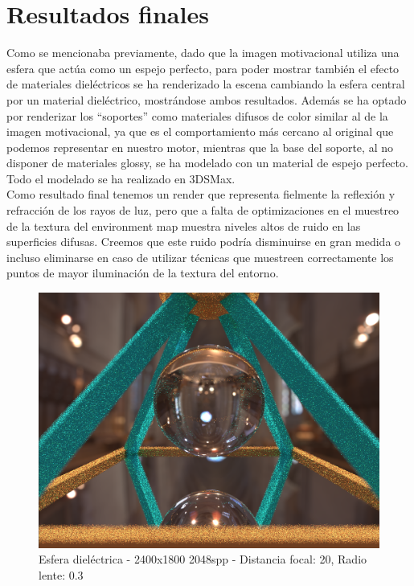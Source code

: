 \documentclass[10pt,oneside,a4paper]{article}
\begin{document}
\section{Resultados finales}
Como se mencionaba previamente, dado que la imagen motivacional utiliza una esfera que actúa como un espejo perfecto, para poder mostrar también el efecto de materiales dieléctricos se ha renderizado la escena cambiando la esfera central por un material dieléctrico, mostrándose ambos resultados. Además se ha optado por renderizar los ``soportes'' como materiales difusos de color similar al de la imagen motivacional, ya que es el comportamiento más cercano al original que podemos representar en nuestro motor, mientras que la base del soporte, al no disponer de materiales glossy, se ha modelado con un material de espejo perfecto. Todo el modelado se ha realizado en 3DSMax.\\

Como resultado final tenemos un render que representa fielmente la reflexión y refracción de los rayos de luz, pero que a falta de optimizaciones en el muestreo de la textura del environment map muestra niveles altos de ruido en las superficies difusas. Creemos que este ruido podría disminuirse en gran medida o incluso eliminarse en caso de utilizar técnicas que muestreen correctamente los puntos de mayor iluminación de la textura del entorno.

\begin{figure}[h]
\centering
\includegraphics[width=1\linewidth]{images/escena_2400x1800_2048spp_dof20-03_screencap.png}
\caption{Esfera dieléctrica - 2400x1800 2048spp - Distancia focal: 20, Radio lente: 0.3}
\label{fig:disp}
\end{figure}
\end{document}
